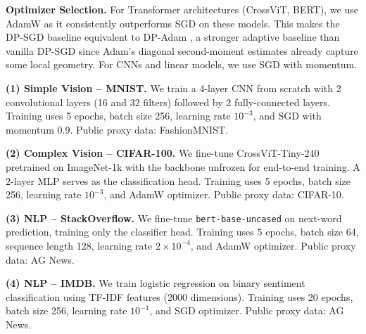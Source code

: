 \documentclass{article}
\theoremstyle{plain}
\theoremstyle{definition}
\theoremstyle{remark}
\begin{document}
\textbf{Optimizer Selection.} For Transformer architectures (CrossViT, BERT), we use AdamW \cite{loshchilov2018decoupled} as it consistently outperforms SGD on these models. This makes the DP-SGD baseline equivalent to DP-Adam , a stronger adaptive baseline than vanilla DP-SGD since Adam's diagonal second-moment estimates already capture some local geometry. For CNNs and linear models, we use SGD with momentum.

\textbf{(1) Simple Vision -- MNIST.} We train a 4-layer CNN from scratch with 2 convolutional layers (16 and 32 filters) followed by 2 fully-connected layers. Training uses 5 epochs, batch size 256, learning rate $10^{-3}$, and SGD with momentum 0.9. Public proxy data: FashionMNIST.

\textbf{(2) Complex Vision -- CIFAR-100.} We fine-tune CrossViT-Tiny-240 pretrained on ImageNet-1k with the backbone unfrozen for end-to-end training. A 2-layer MLP serves as the classification head. Training uses 5 epochs, batch size 256, learning rate $10^{-3}$, and AdamW optimizer. Public proxy data: CIFAR-10.

\textbf{(3) NLP -- StackOverflow.} We fine-tune \texttt{bert-base-uncased} on next-word prediction, training only the classifier head. Training uses 5 epochs, batch size 64, sequence length 128, learning rate $2{\times}10^{-4}$, and AdamW optimizer. Public proxy data: AG News.

\textbf{(4) NLP -- IMDB.} We train logistic regression on binary sentiment classification using TF-IDF features (2000 dimensions). Training uses 20 epochs, batch size 256, learning rate $10^{-1}$, and SGD optimizer. Public proxy data: AG News.
\end{document}
